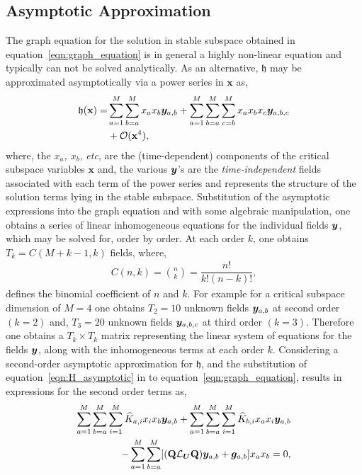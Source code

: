 \subsection{Asymptotic Approximation}
\label{sec:asymptotic_center_manifold}

The graph equation for the solution in stable subspace obtained in equation~\eqref{eqn:graph_equation} is in general a highly non-linear equation and typically can not be solved analytically. As an alternative, $\mathfrak{h}$ may be approximated asymptotically via a power series in $\mathbf{x}$ as, 
\begin{align}
	\label{eqn:H_asymptotic}
	\begin{split}
	\mathfrak{h}(\mathbf{x}) =& \sum_{a=1}^{M}\sum_{b=a}^{M} x_{a}x_{b}\boldsymbol{y}_{a,b} +
	\sum_{a=1}^{M}\sum_{b=a}^{M}\sum_{c=b}^{M} x_{a}x_{b}x_{c}\boldsymbol{y}_{a,b,c} \\
	& + \mathcal{O}(\mathbf{x}^{4}),
\end{split}
\end{align}
where, the $x_{a},\ x_{b}$, \textit{etc}, are the (time-dependent) components of the critical subspace variables $\mathbf{x}$ and, the various $\boldsymbol{y}$'s are the \emph{time-independent} fields associated with each term of the power series and represents the structure of the solution terms lying in the stable subspace. Substitution of the asymptotic expressions into the graph equation and with some algebraic manipulation, one obtains a series of linear inhomogeneous equations for the individual fields $\boldsymbol{y}$, which may be solved for, order by order. At each order $k$, one obtains $T_{k} = C(M+k-1,k)$ fields, where, 
\begin{align}
	\label{eqn:binomial}
	C(n,k) = \binom{n}{k} = \dfrac{n!}{k! (n-k)!},
\end{align}
defines the binomial coefficient of $n$ and $k$. For example for a critical subspace dimension of $M=4$ one obtains $T_{2} = 10$ unknown fields $\boldsymbol{y}_{a,b}$ at second order $(k=2)$ and, $T_{3} = 20$ unknown fields $\boldsymbol{y}_{a,b,c}$ at third order $(k=3)$. Therefore one obtains a $T_{k}\times T_{k}$ matrix representing the linear system of equations for the fields $\boldsymbol{y}$, along with the inhomogeneous terms at each order $k$. Considering a second-order asymptotic approximation for $\mathfrak{h}$, and the substitution of equation~\eqref{eqn:H_asymptotic} in to equation~\eqref{eqn:graph_equation}, results in expressions for the second order terms as,
\begin{align}
	\begin{split}
	\sum_{a=1}^{M}\sum_{b=a}^{M}\sum_{i=1}^{M}\widehat{K}_{a,i}x_{i}x_{b}\boldsymbol{y}_{a,b}  + \sum_{a=1}^{M}\sum_{b=a}^{M}\sum_{i=1}^{M}\widehat{K}_{b,i}x_{a}x_{i}\boldsymbol{y}_{a,b} \\
	- \sum_{a=1}^{M}\sum_{b=a}^{M}[(\mathbf{Q}\mathcal{L}_{\boldsymbol{U}}\mathbf{Q})\boldsymbol{y}_{a,b} + \boldsymbol{g}_{a,b}]x_{a}x_{b} = 0,
	\end{split}
\end{align}
